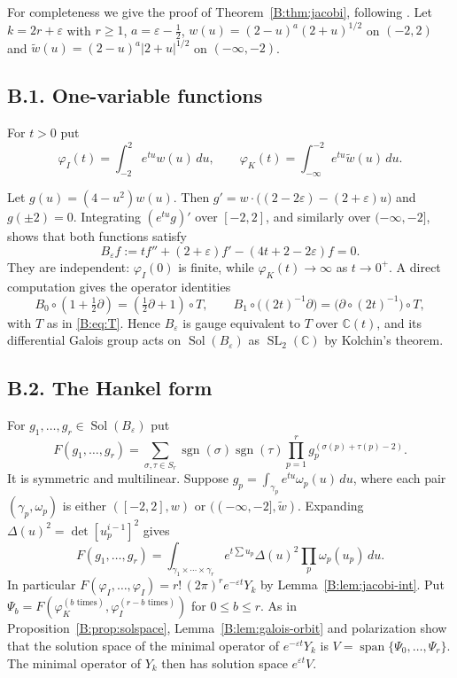\documentclass[11pt,a4paper]{article}
\theoremstyle{definition}
\theoremstyle{remark}
\newcommand{\C}{\mathbb C}
\DeclareMathOperator{\Sol}{Sol}
\DeclareMathOperator{\sgn}{sgn}
\DeclareMathOperator{\SL}{SL}
\DeclareMathOperator{\spn}{span}
\numberwithin{equation}{section}
\begin{document}
For completeness we give the proof of Theorem~\ref{B:thm:jacobi}, following \cite[Part~I]{Kei26}. Let $k=2r+\varepsilon$ with $r\ge1$, $a=\varepsilon-\frac12$, $w(u)=(2-u)^a(2+u)^{1/2}$ on $(-2,2)$ and $\tilde w(u)=(2-u)^a|2+u|^{1/2}$ on $(-\infty,-2)$.

\subsection*{B.1. One-variable functions}
For $t>0$ put
\[
\varphi_I(t)=\int_{-2}^2e^{tu}w(u)\,du,\qquad\varphi_K(t)=\int_{-\infty}^{-2}e^{tu}\tilde w(u)\,du.
\]

Let $g(u)=(4-u^2)w(u)$. Then $g'=w\cdot\bigl((2-2\varepsilon)-(2+\varepsilon)u\bigr)$ and $g(\pm2)=0$. Integrating $(e^{tu}g)'$ over $[-2,2]$, and similarly over $(-\infty,-2]$, shows that both functions satisfy
\[
B_\varepsilon f:=tf''+(2+\varepsilon)f'-(4t+2-2\varepsilon)f=0 .
\]
They are independent: $\varphi_I(0)$ is finite, while $\varphi_K(t)\to\infty$ as $t\to0^+$. A direct computation gives the operator identities
\[
B_0\circ(1+\tfrac12\partial)=(\tfrac12\partial+1)\circ T,\qquad B_1\circ\bigl((2t)^{-1}\partial\bigr)=\bigl(\partial\circ(2t)^{-1}\bigr)\circ T,
\]
with $T$ as in \eqref{B:eq:T}. Hence $B_\varepsilon$ is gauge equivalent to $T$ over $\C(t)$, and its differential Galois group acts on $\Sol(B_\varepsilon)$ as $\SL_2(\C)$ by Kolchin's theorem.

\subsection*{B.2. The Hankel form}
For $g_1,\dots,g_r\in\Sol(B_\varepsilon)$ put
\[
F(g_1,\dots,g_r)=\sum_{\sigma,\tau\in S_r}\sgn(\sigma)\sgn(\tau)\prod_{p=1}^rg_p^{(\sigma(p)+\tau(p)-2)} .
\]
It is symmetric and multilinear. Suppose $g_p=\int_{\gamma_p}e^{tu}\omega_p(u)\,du$, where each pair $(\gamma_p,\omega_p)$ is either $([-2,2],w)$ or $((-\infty,-2],\tilde w)$. Expanding $\Delta(u)^2=\det[u_p^{i-1}]^2$ gives
\[
F(g_1,\dots,g_r)=\int_{\gamma_1\times\cdots\times\gamma_r}e^{t\sum u_p}\Delta(u)^2\prod_p\omega_p(u_p)\,du .
\]
In particular $F(\varphi_I,\dots,\varphi_I)=r!\,(2\pi)^re^{-\varepsilon t}Y_k$ by Lemma~\ref{B:lem:jacobi-int}. Put $\Psi_b=F(\varphi_K^{(b\text{ times})},\varphi_I^{(r-b\text{ times})})$ for $0\le b\le r$. As in Proposition~\ref{B:prop:solspace}, Lemma~\ref{B:lem:galois-orbit} and polarization show that the solution space of the minimal operator of $e^{-\varepsilon t}Y_k$ is $V=\spn\{\Psi_0,\dots,\Psi_r\}$. The minimal operator of $Y_k$ then has solution space $e^{\varepsilon t}V$.
\end{document}
